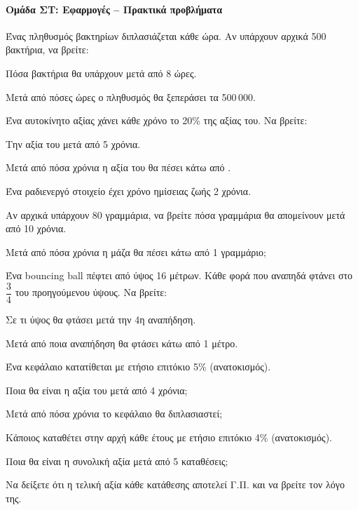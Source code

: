\documentclass[11pt,a4paper,modern]{FFExercises}
\begin{document}
\paragraph{Ομάδα ΣΤ: Εφαρμογές -- Πρακτικά προβλήματα}

\askhsh
Ένας πληθυσμός βακτηρίων διπλασιάζεται κάθε ώρα. Αν υπάρχουν αρχικά 500 βακτήρια, να βρείτε:
\begin{alist}
  \item Πόσα βακτήρια θα υπάρχουν μετά από 8 ώρες.
  \item Μετά από πόσες ώρες ο πληθυσμός θα ξεπεράσει τα 500\,000.
\end{alist}

\askhsh
Ένα αυτοκίνητο αξίας  χάνει κάθε χρόνο το 20\% της αξίας του. Να βρείτε:
\begin{alist}
  \item Την αξία του μετά από 5 χρόνια.
  \item Μετά από πόσα χρόνια η αξία του θα πέσει κάτω από .
\end{alist}

\askhsh
Ένα ραδιενεργό στοιχείο έχει χρόνο ημίσειας ζωής 2 χρόνια.
\begin{alist}
  \item Αν αρχικά υπάρχουν 80 γραμμάρια, να βρείτε πόσα γραμμάρια θα απομείνουν μετά από 10 χρόνια.
  \item Μετά από πόσα χρόνια η μάζα θα πέσει κάτω από 1 γραμμάριο;
\end{alist}

\askhsh
Ένα bouncing ball πέφτει από ύψος 16 μέτρων. Κάθε φορά που αναπηδά φτάνει στο $\dfrac{3}{4}$ του προηγούμενου ύψους. Να βρείτε:
\begin{alist}
  \item Σε τι ύψος θα φτάσει μετά την 4η αναπήδηση.
  \item Μετά από ποια αναπήδηση θα φτάσει κάτω από 1 μέτρο.
\end{alist}

\askhsh
Ένα κεφάλαιο  κατατίθεται με ετήσιο επιτόκιο 5\% (ανατοκισμός).
\begin{alist}
  \item Ποια θα είναι η αξία του μετά από 4 χρόνια;
  \item Μετά από πόσα χρόνια το κεφάλαιο θα διπλασιαστεί;
\end{alist}

\askhsh
Κάποιος καταθέτει στην αρχή κάθε έτους  με ετήσιο επιτόκιο 4\% (ανατοκισμός).
\begin{alist}
  \item Ποια θα είναι η συνολική αξία μετά από 5 καταθέσεις;
  \item Να δείξετε ότι η τελική αξία κάθε κατάθεσης αποτελεί Γ.Π. και να βρείτε τον λόγο της.
\end{alist}
\end{document}
